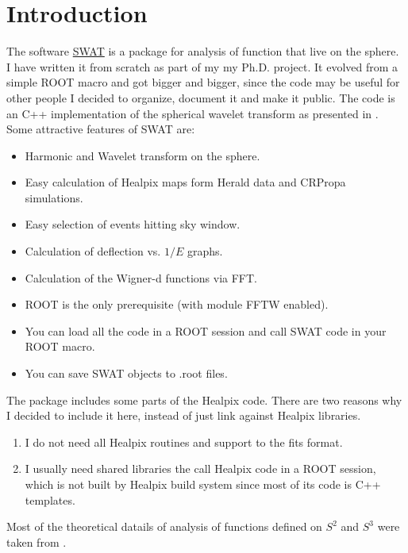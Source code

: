 \documentclass[12pt]{report}
\begin{document}
\newpage
\tableofcontents

\chapter{Introduction} \label{ch::Introduction}

The software \href{http://www.ifi.unicamp.br/~mzimbres}{SWAT} is a package 
for analysis of function that live on the sphere. I have written it from
scratch as part of my my Ph.D. project. It evolved from a simple ROOT macro and
got bigger and bigger, since the code may be useful for other people I
decided to organize, document it and make it public. The code is an C++ implementation of
the spherical wavelet transform as presented in \cite{wiaux}. Some attractive
features of SWAT are:

\begin{itemize}
\item Harmonic and Wavelet transform on the sphere.
\item Easy calculation of Healpix maps form Herald data and CRPropa simulations.
\item Easy selection of events hitting sky window.
\item Calculation of deflection vs. $1/E$ graphs.
\item Calculation of the Wigner-d functions via FFT.
\item ROOT is the only prerequisite (with module FFTW enabled).
\item You can load all the code in a ROOT session and call SWAT code in your ROOT macro.
\item You can save SWAT objects to .root files.
\end{itemize}

The package includes some parts of the Healpix code. There are two reasons
why I decided to include it here, instead of just link against Healpix
libraries.
\begin{enumerate}
\item I do not need all Healpix routines and support to the fits format. 
\item I usually need shared libraries the call Healpix code in a ROOT session, which is not built by
Healpix build system since most of its code is C++ templates.
\end{enumerate}

Most of the theoretical datails of analysis of functions defined on $S^2$ and $S^3$ 
were taken from \cite{wiaux,rockmore,navaza}. 
\end{document}
